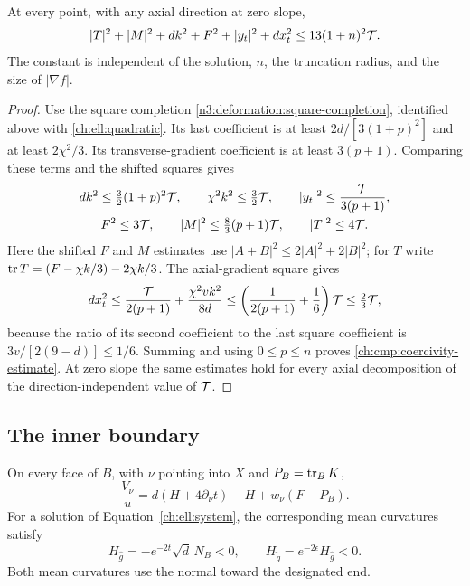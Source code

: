 \begin{lemma}\label{ch:cmp:coercivity}
At every point, with any axial direction at zero slope,
\begin{equation}\label{ch:cmp:coercivity-estimate}
 |T|^2+|M|^2+dk^2+F^2+|y_t|^2+dx_t^2
                  \le13(1+n)^2\mathcal T.
\end{equation}
The constant is independent of the solution, $n$, the truncation radius,
and the size of $|\nabla f|$.
\end{lemma}

\begin{proof}
Use the square completion
\eqref{n3:deformation:square-completion}, identified above with
\eqref{ch:ell:quadratic}. Its last coefficient is at least
$2d/[3(1+p)^2]$ and at least $2\chi^2/3$. Its transverse-gradient
coefficient is at least $3(p+1)$. Comparing these terms and the
shifted squares gives
\[
 \begin{gathered}
 dk^2\le\tfrac32(1+p)^2\mathcal T,\qquad
 \chi^2k^2\le\tfrac32\mathcal T,\qquad
 |y_t|^2\le\frac{\mathcal T}{3(p+1)},\\
 F^2\le3\mathcal T,\qquad
 |M|^2\le\tfrac83(p+1)\mathcal T,\qquad |T|^2\le4\mathcal T.
 \end{gathered}
\]
Here the shifted $F$ and $M$ estimates use
$|A+B|^2\le2|A|^2+2|B|^2$; for $T$ write
$\operatorname{tr} T=(F-\chi k/3)-2\chi k/3$. The axial-gradient square gives
\[
 dx_t^2\le\frac{\mathcal T}{2(p+1)}+\frac{\chi^2vk^2}{8d}
 \le\left(\frac1{2(p+1)}+\frac16\right)\mathcal T
 \le\tfrac23\mathcal T,
\]
because the ratio of its second coefficient to the last square
coefficient is $3v/[2(9-d)]\le1/6$. Summing and using
$0\le p\le n$ proves \eqref{ch:cmp:coercivity-estimate}.
At zero slope the same estimates hold for every axial decomposition
of the direction-independent value of $\mathcal T$.
\end{proof}

\subsection{The inner boundary}

\begin{lemma}\label{ch:cmp:boundary}
On every face of $B$, with $\nu$ pointing into $X$ and
$P_B=\operatorname{tr}_BK$,
\begin{equation}\label{ch:cmp:boundary-identity}
 \frac{V_\nu}{u}
    =d(H+4\partial_\nu t)-H+w_\nu(F-P_B).
\end{equation}
For a solution of Equation~\eqref{ch:ell:system}, the corresponding mean
curvatures satisfy
\begin{equation}\label{ch:cmp:negative-boundary}
 H_{\hat g}=-e^{-2t}\sqrt d\,N_B<0,\qquad
 H_{\widetilde g}=e^{-2\epsilon}H_{\hat g}<0.
\end{equation}
Both mean curvatures use the normal toward the designated end.
\end{lemma}

